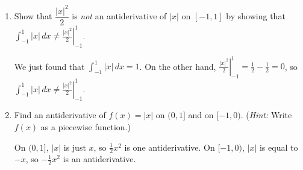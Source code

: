 \documentclass{article}
\begin{document}
\begin{enumerate}
\begin{enumerate}
    \begin{solution} 
      We can picture this integral as the signed area under $y = |x|$ from
      $x = -1$ to $x = 1$:
      \begin{center}
      \end{center}
      This area is $\boxed{1}$.
    \end{solution}
\vfill \vfill 
  \item
    \begin{problem}
      Show that $\dfrac{|x|^2}{2}$ is \emph{not} an antiderivative of
      $|x|$ on $[-1,1]$ by showing that $\displaystyle \int_{-1}^1 |x|\,dx
      \neq \left. \frac{|x|^2}{2} \right|_{-1}^1$. 
    \end{problem}

    \begin{solution} 
      We just found that $\displaystyle \int_{-1}^1 |x|\,dx = 1$.  On
      the other hand, $\displaystyle \left. \frac{|x|^2}{2}
      \right|_{-1}^1 = \frac{1}{2} - \frac{1}{2} = 0$, so $\displaystyle
      \int_{-1}^1 |x|\,dx \neq \left. \frac{|x|^2}{2} \right|_{-1}^1$.
    \end{solution}
\vfill \vfill 
  \item
    \begin{problem}
      Find an antiderivative of $f(x)=|x|$ on $(0, 1]$ and on $[-1,0)$.  (\emph{Hint:} Write $f(x)$ as a piecewise function.)
    \end{problem}

    \begin{solution} %
      On $(0, 1]$, $|x|$ is just $x$, so $\frac{1}{2} x^2$ is one
      antiderivative.  On $[-1, 0)$, $|x|$ is equal to $-x$, so
      $-\frac{1}{2} x^2$ is an antiderivative.  
    \end{solution}
    \vfill \vfill 




\end{enumerate}
\end{enumerate}
\end{document}
